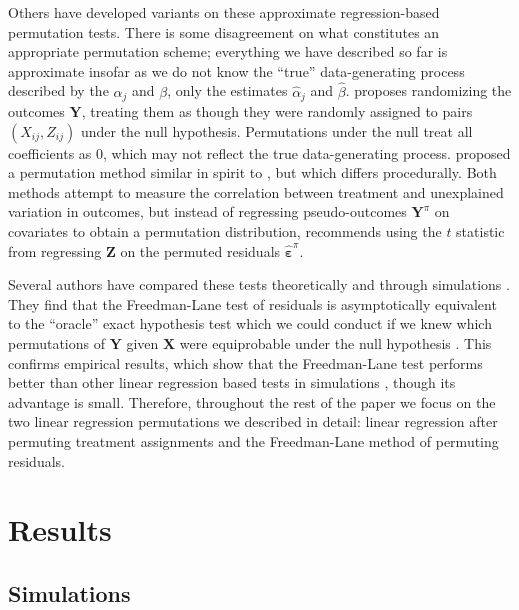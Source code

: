 \documentclass[11pt]{article}
\begin{document}
Others have developed variants on these approximate regression-based permutation tests. 
There is some disagreement on what constitutes an appropriate permutation scheme;
everything we have described so far is approximate insofar as we do not know the ``true'' data-generating process described by the $\alpha_j$ and $\beta$,
only the estimates $\hat{\alpha}_j$ and $\hat{\beta}$.
\cite{manly_randomization_2006} proposes randomizing the outcomes $\mathbf{Y}$, treating them as though they were randomly assigned to pairs $(X_{ij}, Z_{ij})$ under the null hypothesis.
Permutations under the null treat all coefficients as 0, which may not reflect the true data-generating process.
\cite{kennedy_randomization_1995} proposed a permutation method similar in spirit to \cite{freedman_nonstochastic_1983}, but which differs procedurally.
Both methods attempt to measure the correlation between treatment and unexplained variation in outcomes, but
instead of regressing pseudo-outcomes $\mathbf{Y}^\pi$ on covariates to obtain a permutation distribution, \cite{kennedy_randomization_1995} recommends using the $t$ statistic from regressing $\mathbf{Z}$ on the permuted residuals $\mathbf{\hat{\varepsilon}}^\pi$. 

Several authors have compared these tests theoretically and through simulations \cite{anderson_empirical_1999, anderson_permutation_2001, kennedy_randomization_1996}.
They find that the Freedman-Lane test of residuals is asymptotically equivalent to the ``oracle'' exact hypothesis test which we could conduct if we knew which permutations of $\mathbf{Y}$ given $\mathbf{X}$ were equiprobable under the null hypothesis \cite{anderson_permutation_2001}.
This confirms empirical results, which show that the Freedman-Lane test performs better than other linear regression based tests in simulations \cite{anderson_empirical_1999}, though its advantage is small.
Therefore, throughout the rest of the paper we focus on the two linear regression permutations we described in detail: linear regression after permuting treatment assignments and the Freedman-Lane method of permuting residuals.


\section*{Results}
\subsection*{Simulations}\label{simulations}
\end{document}
